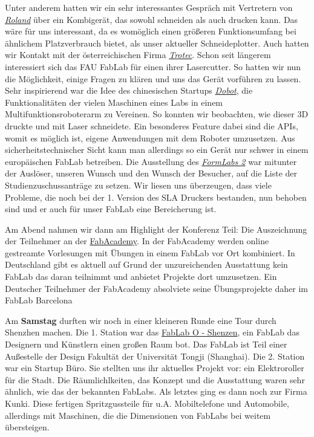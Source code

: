 \documentclass{\basedir/fablab-document}
\begin{document}
Unter anderem hatten wir ein sehr interessantes Gespräch mit Vertretern
von \href{http://www.rolanddg.com/}{\emph{Roland}} über ein Kombigerät,
das sowohl schneiden als auch drucken kann. Das wäre für uns
interessant, da es womöglich einen größeren Funktionsumfang bei
ähnlichem Platzverbrauch bietet, als unser aktueller Schneideplotter.
Auch hatten wir Kontakt mit der österreichischen Firma
\href{https://www.troteclaser.com/}{\emph{Trotec}}. Schon seit längerem
interessiert sich das FAU FabLab für einen ihrer Lasercutter. So hatten
wir nun die Möglichkeit, einige Fragen zu klären und uns das Gerät
vorführen zu lassen. Sehr inspirierend war die Idee des chinesischen
Startups \href{http://dobot.cc/}{\emph{Dobot}}, die Funktionalitäten der
vielen Maschinen eines Labs in einem Multifunktionsroboterarm zu
Vereinen. So konnten wir beobachten, wie dieser 3D druckte und mit Laser
schneidete. Ein besonderes Feature dabei sind die APIs, womit es möglich
ist, eigene Anwendungen mit dem Roboter umzusetzen. Aus
sicherheitstechnischer Sicht kann man allerdings so ein Gerät nur schwer
in einem europäischen FabLab betreiben. Die Ausstellung des
\href{https://formlabs.com/}{\emph{FormLabs 2}} war mitunter der
Auslöser, unseren Wunsch und den Wunsch der Besucher, auf die Liste der
Studienzuschussanträge zu setzen. Wir liesen uns überzeugen, dass viele
Probleme, die noch bei der 1. Version des SLA Druckers bestanden, nun
behoben sind und er auch für unser FabLab eine Bereicherung ist.

Am Abend nahmen wir dann am Highlight der Konferenz Teil: Die
Auszeichnung der Teilnehmer an der
\href{http://fabacademy.org/}{FabAcademy}. In der FabAcademy werden
online gestreamte Vorlesungen mit Übungen in einem FabLab vor Ort
kombiniert. In Deutschland gibt es aktuell auf Grund der unzureichenden
Ausstattung kein FabLab das daran teilnimmt und anbietet Projekte dort
umzusetzen. Ein Deutscher Teilnehmer der FabAcademy absolviete seine
Übungsprojekte daher im FabLab Barcelona

Am \textbf{Samstag} durften wir noch in einer kleineren Runde eine Tour
durch Shenzhen machen. Die 1. Station war das
\href{https://www.fablabs.io/fablaboshenzhen}{FabLab O - Shenzen}, ein
FabLab das Designern und Künstlern einen großen Raum bot. Das FabLab ist
Teil einer Außestelle der Design Fakultät der Universität Tongji
(Shanghai). Die 2. Station war ein Startup Büro. Sie stellten uns ihr
aktuelles Projekt vor: ein Elektroroller für die Stadt. Die
Räumlichlkeiten, das Konzept und die Ausstattung waren sehr ähnlich, wie
das der bekannten FabLabs. Als letztes ging es dann noch zur Firma
Kunki. Diese fertigen Spritzgussteile für u.A. Mobiltelefone und
Automobile, allerdings mit Maschinen, die die Dimensionen von FabLabs
bei weitem übersteigen.
\end{document}
